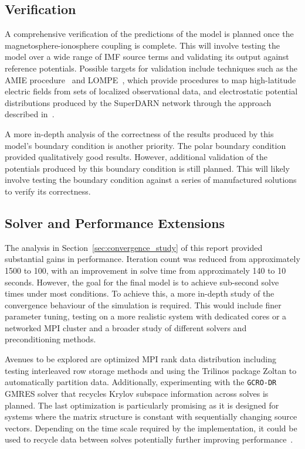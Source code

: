 \subsection{Verification}
A comprehensive verification of the predictions of the model is planned once the magnetosphere-ionosphere coupling is complete. This will involve testing the model over a wide range of IMF source terms and validating its output against reference potentials. Possible targets for validation include techniques such as the AMIE procedure~\citep{richmond1988amie} and LOMPE~\citep{local_laundal_2022}, which provide procedures to map high-latitude electric fields from sets of localized observational data, and electrostatic potential distributions produced by the SuperDARN network through the approach described in~\citet{ruohoniemi1998superdarn}.

A more in-depth analysis of the correctness of the results produced by this model's boundary condition is another priority. The polar boundary condition provided qualitatively good results. However, additional validation of the potentials produced by this boundary condition is still planned. This will likely involve testing the boundary condition against a series of manufactured solutions to verify its correctness.

\subsection{Solver and Performance Extensions}
The analysis in Section~\ref{sec:convergence_study} of this report provided substantial gains in performance. Iteration count was reduced from approximately 1500 to 100, with an improvement in solve time from approximately 140 to 10 seconds. However, the goal for the final model is to achieve sub-second solve times under most conditions. To achieve this, a more in-depth study of the convergence behaviour of the simulation is required. This would include finer parameter tuning, testing on a more realistic system with dedicated cores or a networked MPI cluster and a broader study of different solvers and preconditioning methods.

Avenues to be explored are optimized MPI rank data distribution including testing interleaved row storage methods and using the Trilinos package Zoltan to automatically partition data. Additionally, experimenting with the \texttt{GCRO-DR} GMRES solver that recycles Krylov subspace information across solves is planned. The last optimization is particularly promising as it is designed for systems where the matrix structure is constant with sequentially changing source vectors. Depending on the time scale required by the implementation, it could be used to recycle data between solves potentially further improving performance~\citep{parks2006}.
